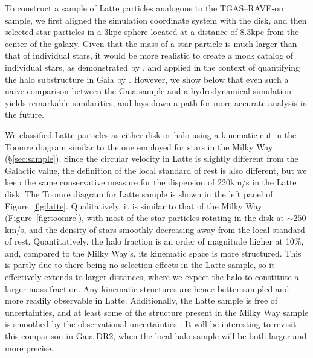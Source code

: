 \documentclass[apj, twocolappendix, numberedappendix, appendixfloats]{emulateapj}
\begin{document}
To construct a sample of Latte particles analogous to the TGAS--RAVE-on sample, we first aligned the simulation coordinate system with the disk, and then selected star particles in a 3\;kpc sphere located at a distance of 8.3\;kpc from the center of the galaxy.
Given that the mass of a star particle is much larger than that of individual stars, it would be more realistic to create a mock catalog of individual stars, as demonstrated by \citet{lowing2015}, and applied in the context of quantifying the halo substructure in Gaia by \citet{mateu2016}.
However, we show below that even such a naive comparison between the Gaia sample and a hydrodynamical simulation yields remarkable similarities, and lays down a path for more accurate analysis in the future.

We classified Latte particles as either disk or halo using a kinematic cut in the Toomre diagram similar to the one employed for stars in the Milky Way (\S\ref{sec:sample}).
Since the circular velocity in Latte is slightly different from the Galactic value, the definition of the local standard of rest is also different, but we keep the same conservative measure for the dispersion of 220\;km/s in the Latte disk.
The Toomre diagram for Latte sample is shown in the left panel of Figure~\ref{fig:latte}.
Qualitatively, it is similar to that of the Milky Way (Figure~\ref{fig:toomre}), with most of the star particles rotating in the disk at $\sim250$\;km/s, and the density of stars smoothly decreasing away from the local standard of rest.
Quantitatively, the halo fraction is an order of magnitude higher at 10\%, and, compared to the Milky Way's, its kinematic space is more structured.
This is partly due to there being no selection effects in the Latte sample, so it effectively extends to larger distances, where we expect the halo to constitute a larger mass fraction.
Any kinematic structures are hence better sampled and more readily observable in Latte.
Additionally, the Latte sample is free of uncertainties, and at least some of the structure present in the Milky Way sample is smoothed by the observational uncertainties \citep[see, e.g.,][]{sanderson2015}.
It will be interesting to revisit this comparison in Gaia DR2, when the local halo sample will be both larger and more precise.
\end{document}
